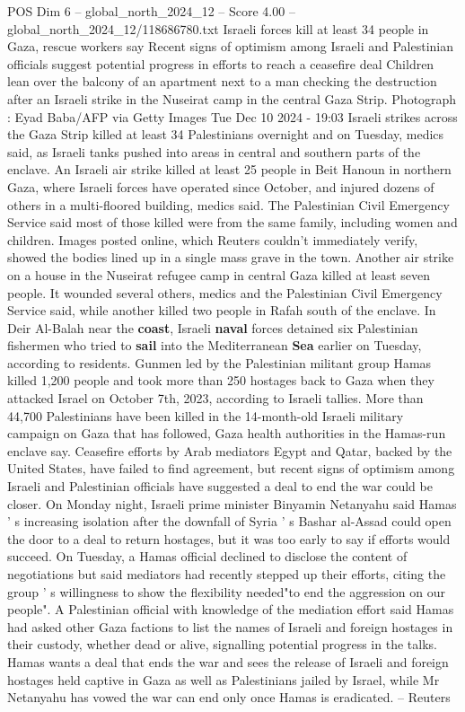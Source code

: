 \begin{textsample}{POS Dim 6 – global\_north\_2024\_12 – Score 4.00 – global\_north\_2024\_12/118686780.txt}  \label{ex:f6_pos_270}
Israeli forces kill at least 34 people in Gaza, rescue workers say Recent signs of optimism among Israeli and Palestinian officials suggest potential progress in efforts to reach a ceasefire deal Children lean over the balcony of an apartment next to a man checking the destruction after an Israeli strike in the Nuseirat camp in the central Gaza Strip.
Photograph : Eyad Baba/AFP via Getty Images Tue Dec 10 2024 - 19:03 Israeli strikes across the Gaza Strip killed at least 34 Palestinians overnight and on Tuesday, medics said, as Israeli tanks pushed into areas in central and southern parts of the enclave.
An Israeli air strike killed at least 25 people in Beit Hanoun in northern Gaza, where Israeli forces have operated since October, and injured dozens of others in a multi-floored building, medics said.
The Palestinian Civil Emergency Service said most of those killed were from the same family, including women and children.
Images posted online, which Reuters couldn't immediately verify, showed the bodies lined up in a single mass grave in the town.
Another air strike on a house in the Nuseirat refugee camp in central Gaza killed at least seven people.
It wounded several others, medics and the Palestinian Civil Emergency Service said, while another killed two people in Rafah south of the enclave.
In Deir Al-Balah near the \textbf{coast}, Israeli \textbf{naval} forces detained six Palestinian fishermen who tried to \textbf{sail} into the Mediterranean \textbf{Sea} earlier on Tuesday, according to residents.
Gunmen led by the Palestinian militant group Hamas killed 1,200 people and took more than 250 hostages back to Gaza when they attacked Israel on October 7th, 2023, according to Israeli tallies.
More than 44,700 Palestinians have been killed in the 14-month-old Israeli military campaign on Gaza that has followed, Gaza health authorities in the Hamas-run enclave say.
Ceasefire efforts by Arab mediators Egypt and Qatar, backed by the United States, have failed to find agreement, but recent signs of optimism among Israeli and Palestinian officials have suggested a deal to end the war could be closer.
On Monday night, Israeli prime minister Binyamin Netanyahu said Hamas ' s increasing isolation after the downfall of Syria ' s Bashar al-Assad could open the door to a deal to return hostages, but it was too early to say if efforts would succeed.
On Tuesday, a Hamas official declined to disclose the content of negotiations but said mediators had recently stepped up their efforts, citing the group ' s willingness to show the flexibility needed"to end the aggression on our people".
A Palestinian official with knowledge of the mediation effort said Hamas had asked other Gaza factions to list the names of Israeli and foreign hostages in their custody, whether dead or alive, signalling potential progress in the talks.
Hamas wants a deal that ends the war and sees the release of Israeli and foreign hostages held captive in Gaza as well as Palestinians jailed by Israel, while Mr Netanyahu has vowed the war can end only once Hamas is eradicated. -- Reuters

\end{textsample}
